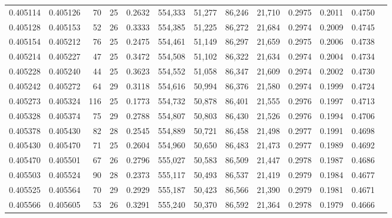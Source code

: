 \begin{tabular}{rrrrrrrrrrrrr}
0.405114 & 0.405126 &    70 &  25 &                                     0.2632 & 554,333 &  51,277 &  86,246 &  21,710 & 0.2975 & 0.2011 & 0.4750 \\
0.405128 & 0.405153 &    52 &  26 &                                     0.3333 & 554,385 &  51,225 &  86,272 &  21,684 & 0.2974 & 0.2009 & 0.4745 \\
0.405154 & 0.405212 &    76 &  25 &                                     0.2475 & 554,461 &  51,149 &  86,297 &  21,659 & 0.2975 & 0.2006 & 0.4738 \\
0.405214 & 0.405227 &    47 &  25 &                                     0.3472 & 554,508 &  51,102 &  86,322 &  21,634 & 0.2974 & 0.2004 & 0.4734 \\
0.405228 & 0.405240 &    44 &  25 &                                     0.3623 & 554,552 &  51,058 &  86,347 &  21,609 & 0.2974 & 0.2002 & 0.4730 \\
0.405242 & 0.405272 &    64 &  29 &                                     0.3118 & 554,616 &  50,994 &  86,376 &  21,580 & 0.2974 & 0.1999 & 0.4724 \\
0.405273 & 0.405324 &   116 &  25 &                                     0.1773 & 554,732 &  50,878 &  86,401 &  21,555 & 0.2976 & 0.1997 & 0.4713 \\
0.405328 & 0.405374 &    75 &  29 &                                     0.2788 & 554,807 &  50,803 &  86,430 &  21,526 & 0.2976 & 0.1994 & 0.4706 \\
0.405378 & 0.405430 &    82 &  28 &                                     0.2545 & 554,889 &  50,721 &  86,458 &  21,498 & 0.2977 & 0.1991 & 0.4698 \\
0.405430 & 0.405470 &    71 &  25 &                                     0.2604 & 554,960 &  50,650 &  86,483 &  21,473 & 0.2977 & 0.1989 & 0.4692 \\
0.405470 & 0.405501 &    67 &  26 &                                     0.2796 & 555,027 &  50,583 &  86,509 &  21,447 & 0.2978 & 0.1987 & 0.4686 \\
0.405503 & 0.405524 &    90 &  28 &                                     0.2373 & 555,117 &  50,493 &  86,537 &  21,419 & 0.2979 & 0.1984 & 0.4677 \\
0.405525 & 0.405564 &    70 &  29 &                                     0.2929 & 555,187 &  50,423 &  86,566 &  21,390 & 0.2979 & 0.1981 & 0.4671 \\
0.405566 & 0.405605 &    53 &  26 &                                     0.3291 & 555,240 &  50,370 &  86,592 &  21,364 & 0.2978 & 0.1979 & 0.4666 \\

\end{tabular}
